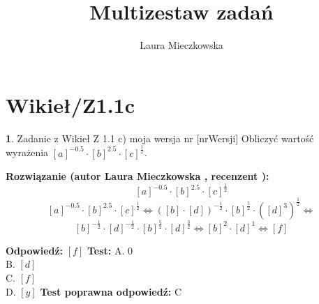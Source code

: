 \documentclass[12pt, a4paper]{article}
\title{Multizestaw zadań}
\author{Laura Mieczkowska}
\date{}
\theoremstyle{definition} %
\newtheorem{zad}{}
\newcommand{\kategoria}[1]{\section{#1}} %
\newcommand{\zadStart}[1]{\begin{zad}#1\newline} %
\newcommand{\zadStop}{\end{zad}}   %
\newcommand{\rozwStart}[2]{\noindent \textbf{Rozwiązanie (autor #1 , recenzent #2): }\newline} %
\newcommand{\odpStart}{\noindent \textbf{Odpowiedź:}\newline}    %
\newcommand{\odpStop}{\newline}                                             %
\newcommand{\testStart}{\noindent \textbf{Test:}\newline} %
\newcommand{\testStop}{\newline} %
\newcommand{\kluczStart}{\noindent \textbf{Test poprawna odpowiedź:}\newline} %
\newcommand{\kluczStop}{\newline} %
\begin{document}
\maketitle


\kategoria{Wikieł/Z1.1c}
\zadStart{Zadanie z Wikieł Z 1.1 c) moja wersja nr [nrWersji]}
Obliczyć wartość wyrażenia $[a]^{-0.5}\cdot[b]^{2.5}\cdot[c]^{\frac{1}{2}}$.
\zadStop
\rozwStart{Laura Mieczkowska}{}
$$[a]^{-0.5}\cdot[b]^{2.5}\cdot[c]^{\frac{1}{2}}$$ 
$$[a]^{-0.5}\cdot[b]^{2.5}\cdot[c]^{\frac{1}{2}} \Leftrightarrow ([b]\cdot[d])^{-\frac{1}{2}}\cdot[b]^{\frac{5}{2}}\cdot([d]^3)^{\frac{1}{2}}\Leftrightarrow $$
$$ [b]^{-\frac{1}{2}}\cdot[d]^{-\frac{1}{2}}\cdot[b]^{\frac{5}{2}}\cdot[d]^{\frac{3}{2}}\Leftrightarrow [b]^2\cdot[d]^1\Leftrightarrow [f]$$



\odpStart
$[f]$
\odpStop
\testStart
A. $0$ \\
B. $[d]$ \\
C. $[f]$ \\
D. $[y]$ 
\testStop
\kluczStart
C
\kluczStop
\end{document}
